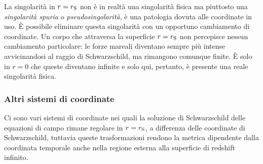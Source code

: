 La singolarità in \(r = r_{\textup{S}}\) non è in realtà una singolarità fisica
ma piuttosto una \emph{singolarità spuria} o \emph{pseudosingolarità}, è una
patologia dovuta alle coordinate in uso.  È possibile eliminare questa
singolarità con un opportuno cambiamento di coordinate.  Un corpo che attraversa
la superficie \(r = r_{\textup{S}}\) non percepisce nessun cambiamento
particolare: le forze mareali diventano sempre più intense avvicinandosi al
raggio di Schwarzschild, ma rimangono comunque finite.  È solo in \(r = 0\) che
queste diventano infinite e solo qui, pertanto, è presente una reale singolarità
fisica.

\subsubsection{Altri sistemi di coordinate}
\label{sec:altre-coordinate}

Ci sono vari sistemi di coordinate nei quali la soluzione di Schwarzschild delle
equazioni di campo rimane regolare in \(r = r_{\textup{S}}\), a differenza delle
coordinate di Schwarzschild, tuttavia queste trasformazioni rendono la metrica
dipendente dalla coordinata temporale anche nella regione esterna alla
superficie di redshift infinito.

